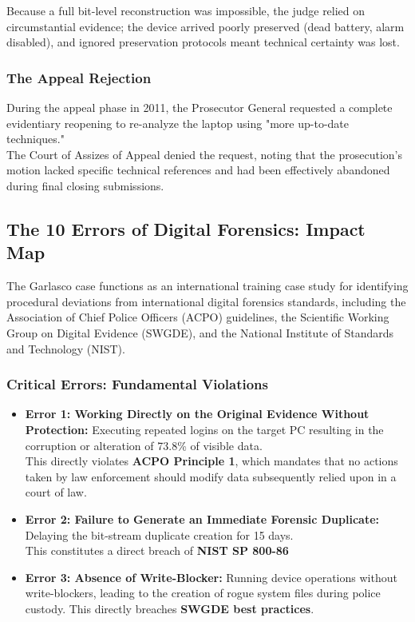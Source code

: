 \noindent
Because a full bit-level reconstruction was impossible, the judge relied on circumstantial evidence; the device arrived poorly preserved (dead battery, alarm disabled), and ignored preservation protocols meant technical certainty was lost.

\subsubsection*{The Appeal Rejection}
During the appeal phase in 2011, the Prosecutor General requested a complete evidentiary reopening to re-analyze the laptop using "more up-to-date techniques." \\
The Court of Assizes of Appeal denied the request, noting that the prosecution's motion lacked specific technical references and had been effectively abandoned during final closing submissions.



\subsection{The 10 Errors of Digital Forensics: Impact Map}
The Garlasco case functions as an international training case study for identifying procedural deviations from international digital forensics standards, including the Association of Chief Police Officers (ACPO) guidelines, the Scientific Working Group on Digital Evidence (SWGDE), and the National Institute of Standards and Technology (NIST).

\subsubsection*{Critical Errors: Fundamental Violations}
\begin{itemize}
    \item \textbf{Error 1: Working Directly on the Original Evidence Without Protection:} Executing repeated logins on the target PC resulting in the corruption or alteration of 73.8\% of visible data.\\ This directly violates \textbf{ACPO Principle 1}, which mandates that no actions taken by law enforcement should modify data subsequently relied upon in a court of law.
    \item \textbf{Error 2: Failure to Generate an Immediate Forensic Duplicate:} Delaying the bit-stream duplicate creation for 15 days.\\
    This constitutes a direct breach of \textbf{NIST SP 800-86}
    \item \textbf{Error 3: Absence of Write-Blocker:} Running device operations without write-blockers, leading to the creation of rogue system files during police custody. This directly breaches \textbf{SWGDE best practices}.
\end{itemize}

